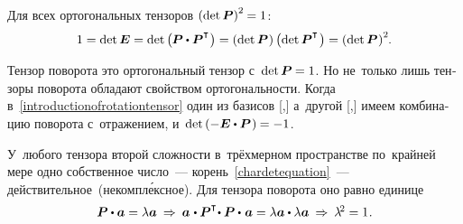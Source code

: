 \begin{otherlanguage}{russian}
Для всех ортогональных тензоров ${\left(\operatorname{det} \bm{P}\right)^2 \hspace{-0.1ex} = 1}$:
\vspace{0.1em}\[
1 = \operatorname{det} \bm{E} = \operatorname{det} \left({\hspace{-0.1ex} \bm{P} \dotp \bm{P}^{\T} \hspace{0.1ex}}\right) =
\left({\operatorname{det} \bm{P} \hspace{0.1ex}}\right) \left({\operatorname{det} \bm{P}^{\T} \hspace{0.2ex}}\right) =
\left(\operatorname{det} \bm{P} \hspace{0.1ex} \right)^2 \hspace{-0.1ex} \!.
\]

Тензор поворота это ортогональный тензор с~${\operatorname{det} \bm{P} \hspace{-0.1ex} = 1}$. Но не~только лишь тензоры поворота обладают свойством ортогональности. Когда в~\eqref{introductionofrotationtensor} один из базисов [,] а~другой [,] имеем комбинацию поворота с~отражением, и~${\operatorname{det} \left( -\bm{E} \dotp \bm{P} \hspace{0.16ex} \right) \hspace{-0.1ex} = -1}$.

У~любого тензора второй сложности в~трёхмерном пространстве по~крайней мере одно  собственное число~--- корень~\eqref{chardetequation}~--- действительное~(некомпл\'{е}ксное). Для тензора поворота оно равно единице
\vspace{0.25em}\[\begin{array}{c}
\bm{P} \dotp \bm{a} = \lambda \bm{a} \:\Rightarrow\:
\tikzmark{BeginPaBrace} \bm{a} \hspace{0.16ex} \dotp \tikzmark{BeginEBrace} \bm{P}^{\T} \tikzmark{EndPaBrace} \hspace{-0.4ex} \dotp \bm{P} \hspace{-0.32ex}\tikzmark{EndEBrace}\hspace{0.32ex} \dotp \hspace{0.16ex} \bm{a} = \lambda \bm{a} \dotp \lambda \bm{a}
\:\Rightarrow\: \lambda^{\!2} = 1\hspace{0.1ex}.
\end{array}\]


\end{otherlanguage}

